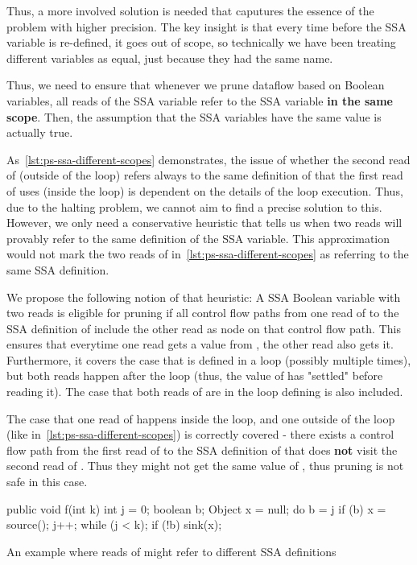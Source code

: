 Thus, a more involved solution is needed that caputures the
essence of the problem with higher precision.
The key insight is that every time before the SSA variable is re-defined, it 
goes out of scope, so technically we have been treating different variables
as equal, just because they had the same name.

Thus, we need to ensure that whenever we prune dataflow based on Boolean variables,
all reads of the SSA variable refer to the SSA variable \textbf{in the same scope}.
Then, the assumption that the SSA variables have the same value is actually true.

As~\autoref{lst:ps-ssa-different-scopes} demonstrates,
the issue of whether the second read of  (outside of the loop)
refers always to the same definition of  that the first read of 
uses (inside the loop) is dependent on the details of the loop execution.
Thus, due to the halting problem, we cannot aim to find a precise solution to this.
However, we only need a conservative heuristic that tells us when
two reads will provably refer to the same definition of the SSA variable.
This approximation would not mark the two reads of 
in~\autoref{lst:ps-ssa-different-scopes} as referring to the same SSA definition.

We propose the following notion of that heuristic:
A SSA Boolean variable  with two reads is eligible for pruning 
if all control flow paths from one read of  to the SSA definition of
 include the other read as node on that control flow path.
This ensures that everytime one read gets a value from , the other read
also gets it.
Furthermore, it covers the case that  is defined in a loop (possibly
multiple times), but both reads happen after the loop (thus, the value of 
has "settled" before reading it).
The case that both reads of  are in the loop defining  is also
included.

The case that one read of  happens inside the loop, and one outside of 
the loop (like in~\autoref{lst:ps-ssa-different-scopes}) is correctly covered - 
there exists a control flow path from the first read of  to the SSA 
definition of  that does \textbf{not} visit the second read of .
Thus they might not get the same value of , thus pruning is not safe
in this case.

\begin{listing}[h]
    \begin{javacode}
public void f(int k) {
    int j = 0;
    boolean b;
    Object x = null;
    do {
        b = j %
        if (b) {
            x = source();
        }
        j++;
    } while (j < k);
    if (!b) {
        sink(x);
    }
}
    \end{javacode}
    \caption{An example where reads of 
     might refer to different SSA definitions}
    \label{lst:ps-ssa-different-scopes}
\end{listing}

